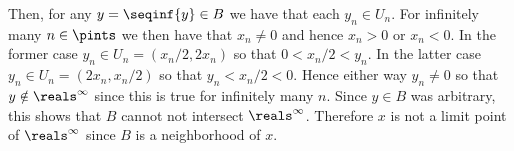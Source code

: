 {{    Then, for any $y = \seqinf{y} \in B$ we have that each $y_n \in U_n$.
    For infinitely many $n \in \pints$ we then have that $x_n \neq 0$ and hence $x_n > 0$ or $x_n < 0$.
    In the former case $y_n \in U_n = (x_n/2, 2x_n)$ so that $0 < x_n/2 < y_n$.
    In the latter case $y_n \in U_n = (2x_n, x_n/2)$ so that $y_n < x_n / 2 < 0$.
    Hence either way $y_n \neq 0$ so that $y \notin \reals^\infty$ since this is true for infinitely many $n$.
    Since $y \in B$ was arbitrary, this shows that $B$ cannot not intersect $\reals^\infty$.
    Therefore $x$ is not a limit point of $\reals^\infty$ since $B$ is a neighborhood of $x$.
  }
}

